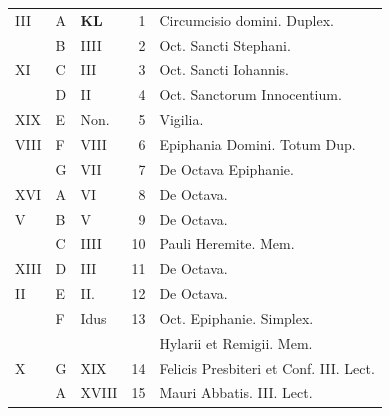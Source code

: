 

\thispagestyle{fancy}


\vspace{+.5em}
\color{Red}\color{black}

\begin{center}
\begin{tabular}{l | l | l | r | l l}
 \color{Red} III & \color{Red} A & \textbf{\color{Red} K\color{Blue}L} & 1 & \color{Red} Circumcisio domini. \color{Red} Duplex. \\
 & B & \color{Red} IIII & 2 & Oct. Sancti Stephani. & \color{Red} \\
\color{Red} XI & C & \color{Red} III & 3 & Oct. Sancti Iohannis. & \\
& D & \color{Red} II & 4 & \color{Red} Oct. Sanctorum Innocentium. & \color{Red} \\
\color{Red} XIX & E & \color{Red} Non. & 5 & \qquad Vigilia. \color{Red} \\
\color{Red} VIII & F & \color{Red} VIII & 6 & Epiphania Domini. Totum Dup. \\
 & G & \color{Red} VII & 7 & De Octava Epiphanie. \\
\color{Red} XVI & \color{Red} A & \color{Red} VI & 8 & De Octava. & \\
\color{Red} V & B & \color{Red} V & 9 & De Octava. & \\
 & C & \color{Red} IIII & 10 & Pauli Heremite. \color{Red} Mem. \\
\color{Red} XIII & D & \color{Red} III & 11 & De Octava. & \color{Red} \\
\color{Red} II & E & \color{Red} II. & 12 & De Octava. & \color{Red} \\
 & F & \color{Red} Idus & 13 & \multicolumn{2}{l}{Oct. Epiphanie. \color{Red} Simplex.} \\
 &  & & & \multicolumn{2}{l}{\quad \color{black} Hylarii et Remigii. \color{Red} Mem.} \\
\color{Red} X & G & \color{Red} XIX & 14 & \multicolumn{2}{l}{Felicis Presbiteri et Conf. III. Lect.} \\
 & \color{Red} A & \color{Red} XVIII & 15 & \color{Red} Mauri Abbatis. III. Lect. \\

\end{tabular}
\end{center}
